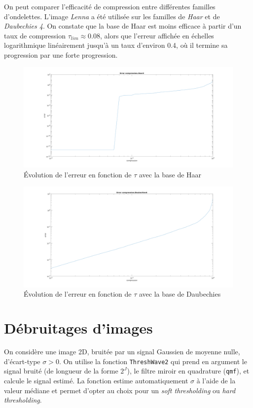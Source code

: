 \documentclass[a4paper,12pt, openany, twoside]{article}
\theoremstyle{break}
\begin{document}
On peut comparer l'efficacité de compression entre différentes familles d'ondelettes. L'image \textit{Lenna} a été utilisée sur les familles de \textit{Haar} et de \textit{Daubechies 4}. On constate que la base de Haar est moins efficace à partir d'un taux de compression $\tau_{lim} \approx 0.08$, alors que l'erreur affichée en échelles logarithmique linéairement jusqu'à un taux d'environ 0.4, où il termine sa progression par une forte progression.


\begin{figure}[H]
  \centering
  \includegraphics[width=\textwidth]{error_comp_Haar4}\hfill
  \caption{Évolution de l'erreur en fonction de $\tau$ avec la base de Haar}
\end{figure}


\begin{figure}[H]
  \centering
  \includegraphics[width=\textwidth]{error_comp_Daubechies4}\hfill
  \caption{Évolution de l'erreur en fonction de $\tau$ avec la base de Daubechies}
\end{figure}
\clearpage
\section{Débruitages d'images}
On considère une image 2D, bruitée par un signal Gaussien de moyenne nulle, d'écart-type $\sigma > 0$. On utilise la fonction \texttt{ThreshWave2} qui prend en argument le signal bruité (de longueur de la forme $2^J$), le filtre miroir en quadrature (\texttt{qmf}), et calcule le signal estimé. La fonction estime automatiquement $\sigma$ à l'aide de la valeur médiane et permet d'opter au choix pour un \textit{soft thresholding} ou \textit{hard thresholding}.
\end{document}
